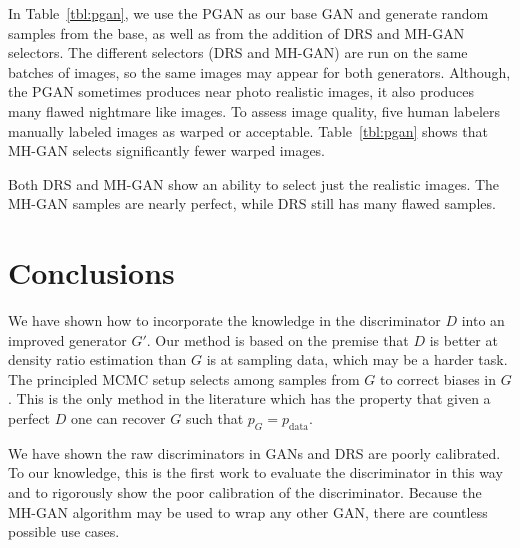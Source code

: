 \documentclass{article}
\newcommand{\PG}{{p_G}}
\newcommand{\PR}{{p_{\textrm{data}}}}
\begin{document}
In Table~\ref{tbl:pgan}, we use the PGAN as our base GAN and generate random samples from the base, as well as from the addition of DRS and MH-GAN selectors.
The different selectors (DRS and MH-GAN) are run on the same batches of images, so the same images may appear for both generators.
Although, the PGAN sometimes produces near photo realistic images, it also produces many flawed nightmare like images.
To assess image quality, five human labelers manually labeled images as warped or acceptable.
Table~\ref{tbl:pgan} shows that MH-GAN selects significantly fewer warped images.

Both DRS and MH-GAN show an ability to select just the realistic images.
The MH-GAN samples are nearly perfect, while DRS still has many flawed samples.

\section{Conclusions}
\label{sec:conclusions}

We have shown how to incorporate the knowledge in the discriminator $D$ into an improved generator $G'$.
Our method is based on the premise that $D$ is better at density ratio estimation than $G$ is at sampling data, which may be a harder task.
The principled MCMC setup selects among samples from $G$ to correct biases in $G$.
This is the only method in the literature which has the property that given a perfect $D$ one can recover $G$ such that $\PG = \PR$.

We have shown the raw discriminators in GANs and DRS are poorly calibrated.
To our knowledge, this is the first work to evaluate the discriminator in this way and to rigorously show the poor calibration of the discriminator.
Because the MH-GAN algorithm may be used to wrap any other GAN, there are countless possible use cases.

\fboxsep=1.5pt  %
\newcommand{\unreal}[1]{\fcolorbox{white}{red}{#1}}
\end{document}
